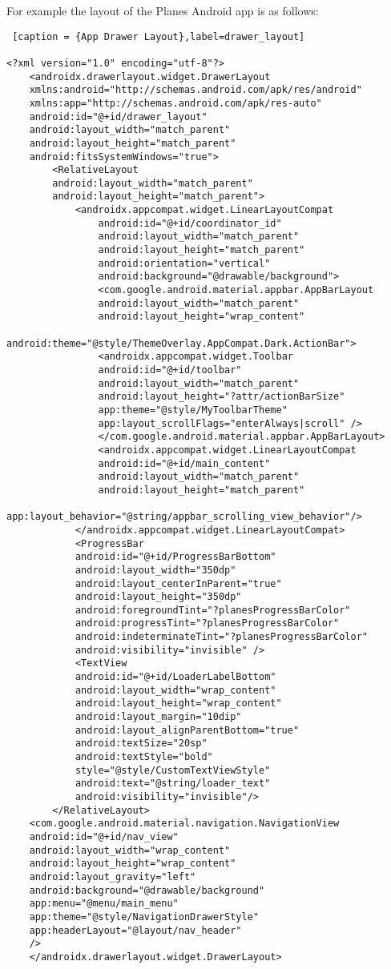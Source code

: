 For example the layout of the Planes Android app is as follows:

\begin{lstlisting} [caption = {App Drawer Layout},label=drawer_layout]

<?xml version="1.0" encoding="utf-8"?>
	<androidx.drawerlayout.widget.DrawerLayout
	xmlns:android="http://schemas.android.com/apk/res/android"
	xmlns:app="http://schemas.android.com/apk/res-auto"
	android:id="@+id/drawer_layout"
	android:layout_width="match_parent"
	android:layout_height="match_parent"
	android:fitsSystemWindows="true">
		<RelativeLayout
		android:layout_width="match_parent"
		android:layout_height="match_parent">
			<androidx.appcompat.widget.LinearLayoutCompat
				android:id="@+id/coordinator_id"
				android:layout_width="match_parent"
				android:layout_height="match_parent"
				android:orientation="vertical"
				android:background="@drawable/background">
				<com.google.android.material.appbar.AppBarLayout
				android:layout_width="match_parent"
				android:layout_height="wrap_content"
				android:theme="@style/ThemeOverlay.AppCompat.Dark.ActionBar">
				<androidx.appcompat.widget.Toolbar
				android:id="@+id/toolbar"
				android:layout_width="match_parent"
				android:layout_height="?attr/actionBarSize"
				app:theme="@style/MyToolbarTheme"
				app:layout_scrollFlags="enterAlways|scroll" />
				</com.google.android.material.appbar.AppBarLayout>
				<androidx.appcompat.widget.LinearLayoutCompat
				android:id="@+id/main_content"
				android:layout_width="match_parent"
				android:layout_height="match_parent"
				app:layout_behavior="@string/appbar_scrolling_view_behavior"/>
			</androidx.appcompat.widget.LinearLayoutCompat>
			<ProgressBar
			android:id="@+id/ProgressBarBottom"
			android:layout_width="350dp"
			android:layout_centerInParent="true"
			android:layout_height="350dp"
			android:foregroundTint="?planesProgressBarColor"
			android:progressTint="?planesProgressBarColor"
			android:indeterminateTint="?planesProgressBarColor"
			android:visibility="invisible" />
			<TextView
			android:id="@+id/LoaderLabelBottom"
			android:layout_width="wrap_content"
			android:layout_height="wrap_content"
			android:layout_margin="10dip"
			android:layout_alignParentBottom="true"
			android:textSize="20sp"
			android:textStyle="bold"
			style="@style/CustomTextViewStyle"
			android:text="@string/loader_text"
			android:visibility="invisible"/>
		</RelativeLayout>
	<com.google.android.material.navigation.NavigationView
	android:id="@+id/nav_view"
	android:layout_width="wrap_content"
	android:layout_height="wrap_content"
	android:layout_gravity="left"
	android:background="@drawable/background"
	app:menu="@menu/main_menu"
	app:theme="@style/NavigationDrawerStyle"
	app:headerLayout="@layout/nav_header"
	/>
	</androidx.drawerlayout.widget.DrawerLayout>
\end{lstlisting}
 
